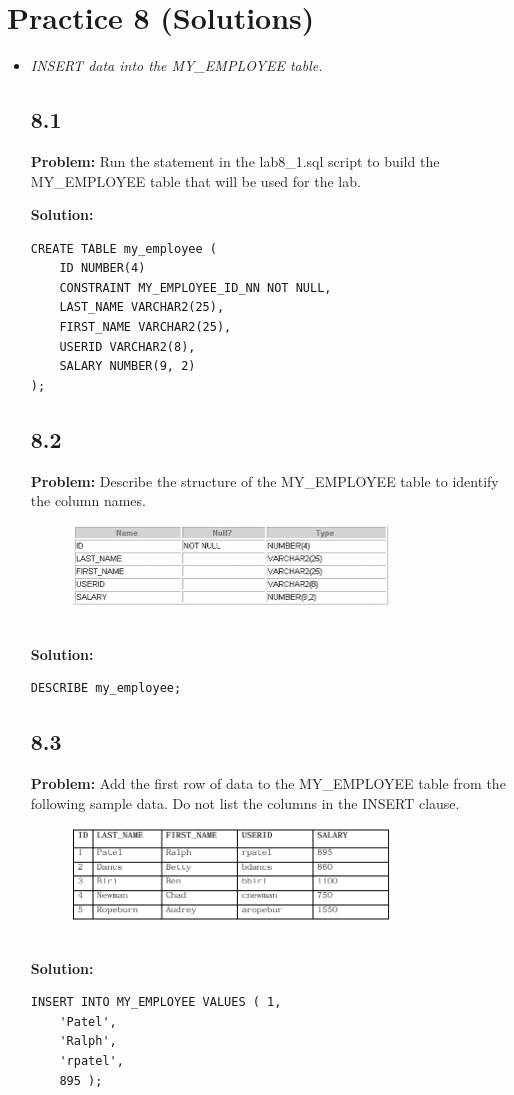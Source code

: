 \documentclass[12pt,a4paper]{article}
\begin{document}
\section{Practice 8 (Solutions)}
\begin{itemize}
    \item \textit{INSERT data into the MY\_EMPLOYEE table.}

\subsection*{8.1}
\textbf{Problem:} Run the statement in the lab8\_1.sql script to build the MY\_EMPLOYEE table that will be used for the lab.

\textbf{Solution:}
\begin{lstlisting}
CREATE TABLE my_employee ( 
    ID NUMBER(4)
    CONSTRAINT MY_EMPLOYEE_ID_NN NOT NULL,
    LAST_NAME VARCHAR2(25),
    FIRST_NAME VARCHAR2(25),
    USERID VARCHAR2(8),
    SALARY NUMBER(9, 2)
);
\end{lstlisting}

\subsection*{8.2}
\textbf{Problem:} Describe the structure of the MY\_EMPLOYEE table to identify the column names.
\\
\begin{figure}[htbp]
  \centering
  \includegraphics[width=0.8\textwidth]{Screenshots/82.png}
\end{figure}\\
\textbf{Solution:}
\begin{lstlisting}
DESCRIBE my_employee;
\end{lstlisting}

\subsection*{8.3}
\textbf{Problem:} Add the first row of data to the MY\_EMPLOYEE table from the following sample data. Do not list the columns in the INSERT clause.
\\
\begin{figure}[htbp]
  \centering
  \includegraphics[width=0.8\textwidth]{Screenshots/83.png}
\end{figure}\\
\textbf{Solution:}
\begin{lstlisting}
INSERT INTO MY_EMPLOYEE VALUES ( 1, 
    'Patel',
    'Ralph',
    'rpatel',
    895 );
\end{lstlisting}


\end{itemize}
\end{document}
